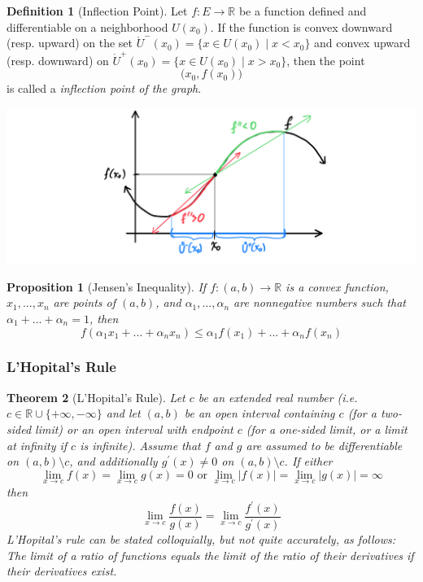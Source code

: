 \documentclass{article}
\newtheorem{theorem}{Theorem}[section]
\newtheorem{proposition}[theorem]{Proposition}
\theoremstyle{remark}
\theoremstyle{definition}
\newtheorem{definition}{Definition}[section]
\begin{document}
\begin{definition}[Inflection Point]
Let $f: E \longrightarrow \mathbb{R}$ be a function defined and differentiable on a neighborhood $U(x_0)$. If the function is convex downward (resp. upward) on the set $\mathring{U}^- (x_0) = \{x \in U(x_0) \;|\; x < x_0\}$ and convex upward (resp. downward) on $\mathring{U}^+ (x_0) = \{x \in U(x_0)\;|\; x > x_0\}$, then the point 
\[\big( x_0, f(x_0) \big)\]
is called a \textit{inflection point of the graph}. 
\begin{center}
    \includegraphics[scale=0.3]{img/Inflection_Point_Analysis.PNG}
\end{center}
\end{definition}

\begin{proposition}[Jensen's Inequality]
If $f: (a, b) \longrightarrow \mathbb{R}$ is a convex function, $x_1, ..., x_n$ are points of $(a, b)$, and $\alpha_1, ..., \alpha_n$ are nonnegative numbers such that $\alpha_1 + ... + \alpha_n = 1$, then 
\[f(\alpha_1 x_1 + ... + \alpha_n x_n) \leq \alpha_1 f(x_1) + ... + \alpha_n f(x_n)\]
\end{proposition}

\subsubsection{L'Hopital's Rule}

\begin{theorem}[L'Hopital's Rule]
Let $c$ be an extended real number (i.e. $c \in \mathbb{R} \cup \{+\infty, -\infty\}$ and let $(a, b)$ be an open interval containing $c$ (for a two-sided limit) or an open interval with endpoint $c$ (for a one-sided limit, or a limit at infinity if $c$ is infinite). Assume that $f$ and $g$ are assumed to be differentiable on $(a, b) \setminus c$, and additionally $g^\prime (x) \neq 0$ on $(a, b) \setminus c$. If either 
\[\lim_{x \rightarrow c} f(x) = \lim_{x \rightarrow c} g(x) = 0 \text{ or } \lim_{x \rightarrow c} |f(x)| = \lim_{x \rightarrow c} |g(x)| = \infty\]
then 
\[\lim_{x \rightarrow c} \frac{f(x)}{g(x)} = \lim_{x \rightarrow c} \frac{f^\prime (x)}{g^\prime (x)}\]
L'Hopital's rule can be stated colloquially, but not quite accurately, as follows: \textit{The limit of a ratio of functions equals the limit of the ratio of their derivatives if their derivatives exist.}
\end{theorem}
\end{document}
